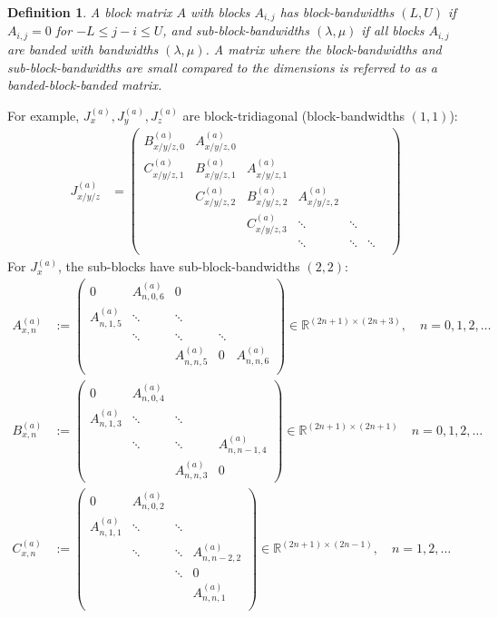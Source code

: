 \documentclass[11pt, oneside]{article}   	%
\newcommand{\R}{\mathbb{R}}
\newtheorem{definition}{Definition}
\begin{document}
\begin{definition}
A block matrix $A$ with blocks $A_{i,j}$ has block-bandwidths $(L,U)$ if $A_{i,j} = 0$ for $- L \leq j-i \leq U$, and sub-block-bandwidths $(\lambda, \mu)$ if all blocks $A_{i,j}$ are banded with bandwidths $(\lambda,\mu)$. A matrix where the block-bandwidths and sub-block-bandwidths are small compared to the dimensions is referred to as a banded-block-banded matrix. 
\end{definition}
For example, $J_x^{(a)}, J_y^{(a)}, J_z^{(a)}$ are block-tridiagonal (block-bandwidths $(1,1)$):
\begin{align*}
	J_{x/y/z}^{(a)} &= 
		\begin{pmatrix}
			B^{(a)}_{x/y/z, 0} & A^{(a)}_{x/y/z, 0} & & & & \\
			C^{(a)}_{x/y/z, 1} & B^{(a)}_{x/y/z, 1} & A^{(a)}_{x/y/z, 1} & & & \\
			& C^{(a)}_{x/y/z, 2} & B^{(a)}_{x/y/z, 2} & A^{(a)}_{x/y/z, 2} & & & \\
			& & C^{(a)}_{x/y/z, 3} & \ddots & \ddots & \\
			& & & \ddots & \ddots & \ddots \\
		\end{pmatrix}
\end{align*}
For $J_x^{(a)}$, the sub-blocks have sub-block-bandwidths $(2,2)$:
\begin{align*}
	A^{(a)}_{x,n} &:= 
		\begin{pmatrix}
			0 & A^{(a)}_{n,0,6} & 0 & & \\
			A^{(a)}_{n,1,5} & \ddots & \ddots & & \\
			& \ddots & \ddots & \ddots & \\
			& & A^{(a)}_{n,n,5} & 0 & A^{(a)}_{n,n,6} \\
		\end{pmatrix} \in \R^{(2n+1)\times(2n+3)}, \quad n = 0,1,2,\dots \\
	B^{(a)}_{x,n} &:= 
		\begin{pmatrix}
			0 & A^{(a)}_{n,0,4} & & \\
			A^{(a)}_{n,1,3} & \ddots & \ddots & \\
			& \ddots & \ddots & A^{(a)}_{n,n-1,4} \\
			& & A^{(a)}_{n,n,3} & 0
		\end{pmatrix} \in \R^{(2n+1)\times(2n+1)}  \quad n = 0,1,2,\dots \\
	C^{(a)}_{x,n} &:= 
		\begin{pmatrix}
			0 & A^{(a)}_{n,0,2} & & \\
			A^{(a)}_{n,1,1} & \ddots & \ddots & \\
			& \ddots & \ddots &A^{(a)}_{n,n-2,2} \\
			& & \ddots & 0 \\
			& & & A^{(a)}_{n,n,1} \\
		\end{pmatrix} \in \R^{(2n+1)\times(2n-1)}, \quad n = 1,2,\dots
\end{align*}
\end{document}
